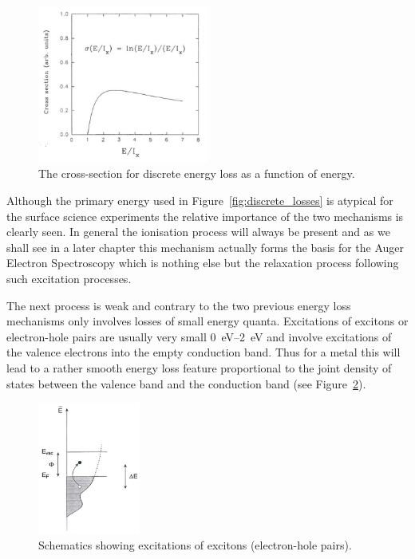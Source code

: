 \begin{figure}[htbp]
\centering
\includegraphics[width=0.5\textwidth]{figures/02_11}
\caption{The cross-section for discrete energy loss as a function of energy.}
\label{fig:discrete_losses_crosssection}
\end{figure}

Although the primary energy used in Figure~\ref{fig:discrete_losses} is atypical for the surface science experiments the relative importance of the two mechanisms is clearly seen. In general the ionisation process will always be present and as we shall see in a later chapter this mechanism actually forms the basis for the Auger Electron Spectroscopy which is nothing else but the relaxation process following such excitation processes.

The next process is weak and contrary to the two previous energy loss mechanisms only involves losses of small energy quanta. Excitations of excitons or electron-hole pairs are usually very small \SIrange{0}{2}{\electronvolt} and involve excitations of the valence electrons into the empty conduction band. Thus for a metal this will lead to a rather smooth energy loss feature proportional to the joint density of states between the valence band and the conduction band (see Figure~\ref{fig:schem_exitons}).

\begin{figure}[htbp]
\centering
\includegraphics[width=0.3\textwidth]{figures/02_12}
\caption{Schematics showing excitations of excitons (electron-hole pairs).}
\label{fig:schem_exitons}
\end{figure}

